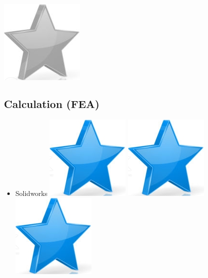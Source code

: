 \documentclass[10pt,a4paper,sans]{article}
\begin{document}
\begin{minipage}[t]{0.28\textwidth}
\begin{mdframed}[style=cadreCompetences]
\begin{itemize}
{                    \includegraphics[scale=0.25]{img/empty_star.png}}
        \end{itemize}

        \subsection{Calculation (FEA)}
            \begin{itemize}
                \item{Solidworks
                    \hfill
                    \includegraphics[scale=0.25]{img/star.png} \hspace{-0.22cm}
                    \includegraphics[scale=0.25]{img/star.png} \hspace{-0.22cm}
                    \includegraphics[scale=0.25]{img/star.png} \hspace{-0.22cm}
}
\end{itemize}
\end{mdframed}
\end{minipage}
\end{document}
